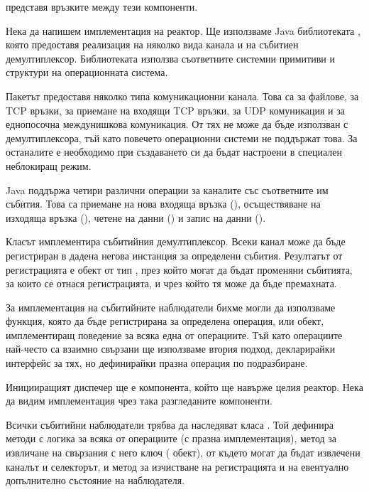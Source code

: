  представя връзките между тези компоненти.

Нека да напишем имплементация на реактор. Ще използваме Java библиотеката , която предоставя реализация на няколко вида канала и на събитиен демултиплексор. Библиотеката използва съответните системни примитиви и структури на операционната система.

Пакетът  предоставя няколко типа комуникационни канала. Това са  за файлове,  за TCP връзки,  за приемане на входящи TCP връзки,  за UDP комуникация и  за еднопосочна междунишкова комуникация. От тях  не може да бъде използван с демултиплексора, тъй като повечето операционни системи не поддържат това. За останалите е необходимо при създаването си да бъдат настроени в специален неблокиращ режим.

Java поддържа четири различни операции за каналите със съответните им събития. Това са приемане на нова входяща връзка (), осъществяване на изходяща връзка (), четене на данни () и запис на данни ().

Класът  имплементира събитийния демултиплексор. Всеки канал може да бъде регистриран в дадена негова инстанция за определени събития. Резултатът от регистрацията е обект от тип , през който могат да бъдат променяни събитията, за които се отнася регистрацията, и чрез който тя може да бъде премахната.

За имплементация на събитийните наблюдатели бихме могли да използваме функция, която да бъде регистрирана за определена операция, или обект, имплементиращ поведение за всяка една от операциите. Тъй като операциите най-често са взаимно свързани ще използваме втория подход, декларирайки интерфейс за тях, но дефинирайки празна операция по подразбиране.

Иницииращият диспечер ще е компонента, който ще навърже целия реактор. Нека да видим имплементация чрез така разгледаните компоненти.



Всички събитийни наблюдатели трябва да наследяват класа . Той дефинира методи с логика за всяка от операциите (с празна имплементация), метод за извличане на свързания с него ключ ( обект), от където могат да бъдат извлечени каналът и селекторът, и метод  за изчистване на регистрацията и на евентуално допълнително състояние на наблюдателя.

